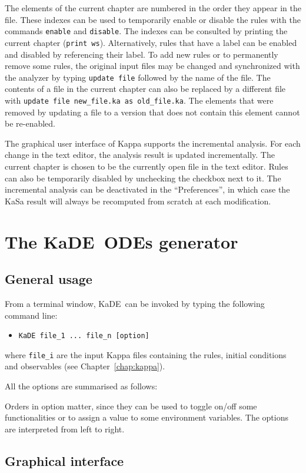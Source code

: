 \documentclass[11pt]{book}
\def\KaSa{\textsf{KaSa}}
\def\KaDE{\textsf{KaDE}}
\def\ttt#1{\texttt{#1}}
\def\ITE#1{\begin{itemize}#1\end{itemize}}
\begin{document}
The elements of the current chapter are numbered in the order they appear in the file. These indexes can be used to temporarily enable or disable the rules with the commands \ttt{enable} and \ttt{disable}. 
The indexes can be consulted by printing the current chapter (\ttt{print ws}).
Alternatively, rules that have a label can be enabled and disabled by referencing their label.
To add new rules or to permanently remove some rules, the original input files may be changed and synchronized with the analyzer by typing \ttt{update file} followed by the name of the file.
The contents of a file in the current chapter can also be replaced by a different file with \ttt{update file new\_file.ka as old\_file.ka}. 
The elements that were removed by updating a file to a version that does not contain this element cannot be re-enabled.

The graphical user interface of Kappa supports the incremental analysis. For each change in the text editor, the analysis result is updated incrementally.
The current chapter is chosen to be the currently open file in the text editor.
Rules can also be temporarily disabled by unchecking the checkbox next to it.
The incremental analysis can be deactivated in the ``Preferences'', in which case the \KaSa{} result will always be recomputed from scratch at each modification.

\chapter{The \KaDE~ODEs generator}

\section{General usage}

From a terminal window, \KaDE~can be invoked by typing the following command line:
\ITE{
\item[\$] \ttt{KaDE file\_1 ... file\_n  [option]}
}
where \ttt{file\_i} are the input Kappa files containing the rules, initial conditions and observables (see Chapter~\ref{chap:kappa}).

All the options are summarised as follows:


Orders in option matter, since they can be used to toggle on/off some functionalities or to assign a value to some environment variables.
The options are interpreted from left to right.

\section{Graphical interface}
\end{document}
